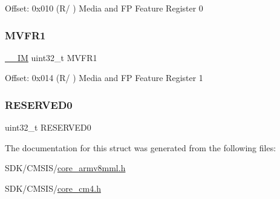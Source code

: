 Offset\+: 0x010 (R/ ) Media and FP Feature Register 0 \mbox{\label{struct_f_p_u___type_a0a610dc4212de3ce1ad62e9afa76c728}} 
\subsubsection{\texorpdfstring{M\+V\+F\+R1}{MVFR1}}
{\footnotesize\ttfamily \mbox{\hyperlink{core__cm4_8h_a4cc1649793116d7c2d8afce7a4ffce43}{\+\_\+\+\_\+\+IM}} uint32\+\_\+t M\+V\+F\+R1}

Offset\+: 0x014 (R/ ) Media and FP Feature Register 1 \mbox{\label{struct_f_p_u___type_affae06cd6df5e9fe9a92994052fd3bec}} 
\subsubsection{\texorpdfstring{R\+E\+S\+E\+R\+V\+E\+D0}{RESERVED0}}
{\footnotesize\ttfamily uint32\+\_\+t R\+E\+S\+E\+R\+V\+E\+D0}



The documentation for this struct was generated from the following files\+:\begin{DoxyCompactItemize}
\item 
S\+D\+K/\+C\+M\+S\+I\+S/\mbox{\hyperlink{core__armv8mml_8h}{core\+\_\+armv8mml.\+h}}\item 
S\+D\+K/\+C\+M\+S\+I\+S/\mbox{\hyperlink{core__cm4_8h}{core\+\_\+cm4.\+h}}\end{DoxyCompactItemize}
